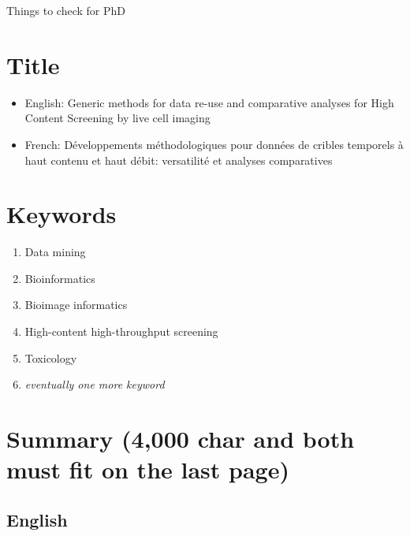 \documentclass[12pt]{article}
\begin{document}
Things to check for PhD
\section{Title}
\begin{itemize}
\item English: Generic methods for data re-use and comparative analyses for High
Content Screening by live cell imaging
\item French: Développements méthodologiques pour données de cribles temporels à haut contenu et haut débit: versatilité et analyses comparatives
\end{itemize}
\section{Keywords}
\begin{enumerate}
\item Data mining
\item Bioinformatics
\item Bioimage informatics
\item High-content high-throughput screening
\item Toxicology
\item \textit{eventually one more keyword}
\end{enumerate}


\section{Summary (4,000 char and both must fit on the last page)}
\subsection{English}
\end{document}
